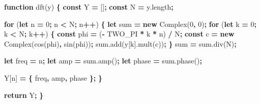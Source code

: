 \documentclass[
]{book}
\newenvironment{Shaded}{\begin{snugshade}}{\end{snugshade}}
\newcommand{\AttributeTok}[1]{\textcolor[rgb]{0.77,0.63,0.00}{#1}}
\newcommand{\ControlFlowTok}[1]{\textcolor[rgb]{0.13,0.29,0.53}{\textbf{#1}}}
\newcommand{\DecValTok}[1]{\textcolor[rgb]{0.00,0.00,0.81}{#1}}
\newcommand{\KeywordTok}[1]{\textcolor[rgb]{0.13,0.29,0.53}{\textbf{#1}}}
\newcommand{\NormalTok}[1]{#1}
\newcommand{\OperatorTok}[1]{\textcolor[rgb]{0.81,0.36,0.00}{\textbf{#1}}}
\newcommand{\VariableTok}[1]{\textcolor[rgb]{0.00,0.00,0.00}{#1}}
\begin{document}
\begin{Shaded}
\begin{Highlighting}[]
\KeywordTok{function} \AttributeTok{dft}\NormalTok{(y) }\OperatorTok{\{}
  \KeywordTok{const}\NormalTok{ Y }\OperatorTok{=}\NormalTok{ []}\OperatorTok{;}
  \KeywordTok{const}\NormalTok{ N }\OperatorTok{=} \VariableTok{y}\NormalTok{.}\AttributeTok{length}\OperatorTok{;}
  
  \ControlFlowTok{for}\NormalTok{ (}\KeywordTok{let}\NormalTok{ n }\OperatorTok{=} \DecValTok{0}\OperatorTok{;}\NormalTok{ n }\OperatorTok{<}\NormalTok{ N}\OperatorTok{;}\NormalTok{ n}\OperatorTok{++}\NormalTok{) }\OperatorTok{\{}
    \KeywordTok{let}\NormalTok{ sum }\OperatorTok{=} \KeywordTok{new} \AttributeTok{Complex}\NormalTok{(}\DecValTok{0}\OperatorTok{,} \DecValTok{0}\NormalTok{)}\OperatorTok{;}
    \ControlFlowTok{for}\NormalTok{ (}\KeywordTok{let}\NormalTok{ k }\OperatorTok{=} \DecValTok{0}\OperatorTok{;}\NormalTok{ k }\OperatorTok{<}\NormalTok{ N}\OperatorTok{;}\NormalTok{ k}\OperatorTok{++}\NormalTok{) }\OperatorTok{\{}
      \KeywordTok{const}\NormalTok{ phi }\OperatorTok{=}\NormalTok{ (}\OperatorTok{-}\NormalTok{ TWO_PI }\OperatorTok{*}\NormalTok{ k }\OperatorTok{*}\NormalTok{ n) }\OperatorTok{/}\NormalTok{ N}\OperatorTok{;}
      \KeywordTok{const}\NormalTok{ c }\OperatorTok{=} \KeywordTok{new} \AttributeTok{Complex}\NormalTok{(}\AttributeTok{cos}\NormalTok{(phi)}\OperatorTok{,} \AttributeTok{sin}\NormalTok{(phi))}\OperatorTok{;}
      \VariableTok{sum}\NormalTok{.}\AttributeTok{add}\NormalTok{(y[k].}\AttributeTok{mult}\NormalTok{(c))}\OperatorTok{;}
    \OperatorTok{\}}
\NormalTok{    sum }\OperatorTok{=} \VariableTok{sum}\NormalTok{.}\AttributeTok{div}\NormalTok{(N)}\OperatorTok{;}

    \KeywordTok{let}\NormalTok{ freq }\OperatorTok{=}\NormalTok{ n}\OperatorTok{;}
    \KeywordTok{let}\NormalTok{ amp }\OperatorTok{=} \VariableTok{sum}\NormalTok{.}\AttributeTok{amp}\NormalTok{()}\OperatorTok{;}
    \KeywordTok{let}\NormalTok{ phase }\OperatorTok{=} \VariableTok{sum}\NormalTok{.}\AttributeTok{phase}\NormalTok{()}\OperatorTok{;}
    
\NormalTok{    Y[n] }\OperatorTok{=} \OperatorTok{\{}\NormalTok{ freq}\OperatorTok{,}\NormalTok{ amp}\OperatorTok{,}\NormalTok{ phase }\OperatorTok{\};}
  \OperatorTok{\}}
  
  \ControlFlowTok{return}\NormalTok{ Y}\OperatorTok{;}
\OperatorTok{\}}
\end{Highlighting}
\end{Shaded}
\end{document}
